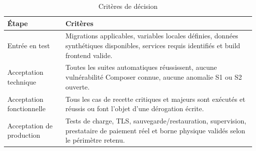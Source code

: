 \begin{table}[H]
\centering
\caption{Critères de décision}
\begin{tabularx}{\textwidth}{|L{3cm}|Y|}
\hline
{}\textbf{Étape} & \textbf{Critères} \\ \hline
Entrée en test & Migrations applicables, variables locales définies, données synthétiques disponibles, services requis identifiés et build frontend valide. \\ \hline
Acceptation technique & Toutes les suites automatiques réussissent, aucune vulnérabilité Composer connue, aucune anomalie S1 ou S2 ouverte. \\ \hline
Acceptation fonctionnelle & Tous les cas de recette critiques et majeurs sont exécutés et réussis ou font l'objet d'une dérogation écrite. \\ \hline
Acceptation de production & Tests de charge, TLS, sauvegarde/restauration, supervision, prestataire de paiement réel et borne physique validés selon le périmètre retenu. \\ \hline
\end{tabularx}
\end{table}
